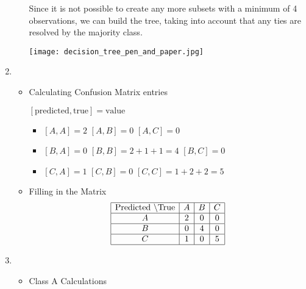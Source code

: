 \documentclass[12pt]{article}
\begin{document}
\begin{enumerate}[leftmargin=\labelsep, label=\textbf{\arabic*.)}]
\begin{itemize}
                    Since it is not possible to create any more subsets with a minimum of 4 observations, we can build the tree, taking into account that any ties are resolved by the majority class. \\
                    \begin{center}
                        \texttt{[image: decision\_tree\_pen\_and\_paper.jpg]}
                    \end{center}
          \end{itemize}
    \item \begin{itemize}
              \item Calculating Confusion Matrix entries

                    $[\text{predicted}, \text{true}] = \text{value}$
                    \begin{itemize}
                        \item $[A, A] = 2$ \hspace{1cm} $[A, B] = 0$ \hspace{1cm} $[A, C] = 0$
                        \item $[B, A] = 0$ \hspace{1cm} $[B, B] = 2 + 1 + 1 = 4$ \hspace{1cm} $[B, C] = 0$
                        \item $[C, A] = 1$ \hspace{1cm} $[C, B] = 0$ \hspace{1cm} $[C, C] = 1 + 2 + 2 = 5$
                    \end{itemize}
              \item Filling in the Matrix
                    \[
                        \begin{array}{|c|c|c|c|}
                            \hline
                            \text{Predicted \textbackslash True} & A & B & C \\
                            \hline
                            A                                    & 2 & 0 & 0 \\
                            \hline
                            B                                    & 0 & 4 & 0 \\
                            \hline
                            C                                    & 1 & 0 & 5 \\
                            \hline
                        \end{array}
                    \]
          \end{itemize}
    \item \begin{itemize}
              \item Class A Calculations


\end{itemize}
\end{enumerate}
\end{document}
